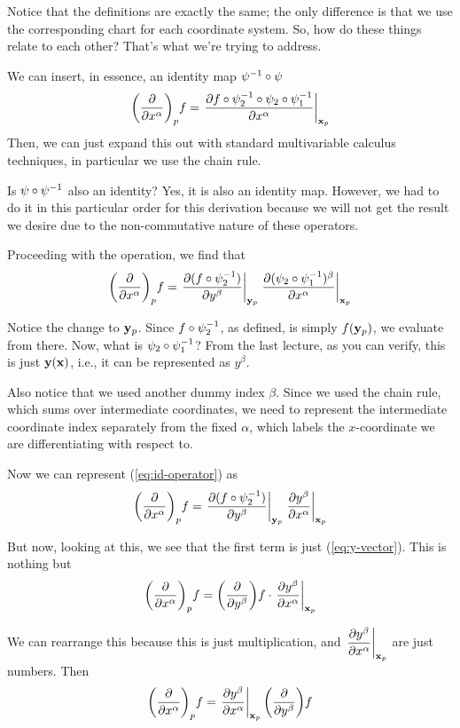 		Notice that the definitions are exactly the same; the only difference is that we use the corresponding chart for each coordinate system.
		So, how do these things relate to each other? That's what we're trying to address.

		We can insert, in essence, an identity map $\psi^{-1}\circ\psi$
		\[
			\qty( \pdv{}{x^\alpha})_p f 
			= \eval{\pdv{f\circ\psi_2\inv \circ \psi_2 \circ\psi_1\inv}{x^\alpha}}_{\vb{x}_p}
		\]
		Then, we can just expand this out with standard multivariable calculus techniques, in particular
		we use the chain rule.

		\begin{question}{Is $\psi\circ\psi^{-1}$ also an identity?}
			Yes, it is also an identity map. However, we had to do it in this particular order for this derivation
			because we will not get the result we desire due to the non-commutative nature of
			these operators.
		\end{question}

		Proceeding with the operation, we find that
		\begin{equation}
			\pqty{ \pdv{}{x^\alpha}}_p f 
			=
			\eval{\pdv{(f\circ\psi_2\inv)}{y^\beta}}_{\vb{y}_p} \eval{\pdv{(\psi_2\circ\psi_1\inv)^\beta}{x^\alpha}}_{\vb{x}_p} 
			\label{eq:id-operator}
		\end{equation}

		Notice the change to $\vb{y}_p$. Since $f\circ \psi_2^{-1}$, as defined, is simply $f(\vb{y}_p)$, we evaluate from there.
		Now, what is $\psi_2\circ\psi_1^{-1}$? From the last lecture, as you can verify, this is just $\vb{y}(\vb{x})$, i.e., it
		can be represented as $y^\beta$.

		Also notice that we used another dummy index $\beta$. Since we used the chain rule, which sums over intermediate coordinates,
		we need to represent the intermediate coordinate index separately from the fixed
		$\alpha$, which labels the $x$-coordinate we are differentiating with respect to.

		Now we can represent (\ref{eq:id-operator}) as
		\[
			\qty( \pdv{}{x^\alpha})_p f 
			=
			\eval{\pdv{(f\circ\psi_2\inv)}{y^\beta}}_{\vb{y}_p} 
			\eval{\pdv{y^\beta}{x^\alpha}}_{\vb{x}_p} 
		\]

		But now, looking at this, we see that the first term is just (\ref{eq:y-vector}). This is nothing but
		\[
			\pqty{ \pdv{}{x^\alpha}}_p f 
			=
			\pqty{\pdv{}{y^\beta}}f \cdot 
			\eval{\pdv{y^\beta}{x^\alpha}}_{\vb{x}_p} 
		\]

		We can rearrange this because this is just multiplication, and $\displaystyle\eval{\pdv{y^\beta}{x^\alpha}}_{\vb{x}_p}$ are just numbers. Then
		\[
			\pqty{ \pdv{}{x^\alpha}}_p f 
			=
			\eval{\pdv{y^\beta}{x^\alpha}}_{\vb{x}_p} 
			\pqty{\pdv{}{y^\beta}}f  
		\]

